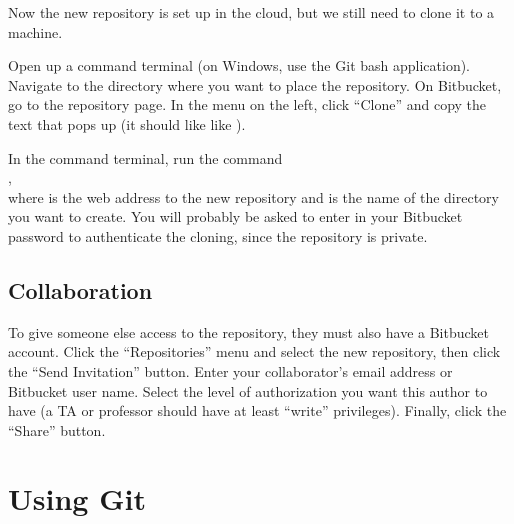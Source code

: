 Now the new repository is set up in the cloud, but we still need to clone it to a machine.

Open up a command terminal (on Windows, use the Git bash application).
Navigate to the directory where you want to place the repository.
On Bitbucket, go to the repository page.
In the menu on the left, click ``Clone'' and copy the text that pops up (it should like like ).

In the command terminal, run the command\\
,\\where {} is the web address to the new repository and  is the name of the directory you want to create.
You will probably be asked to enter in your Bitbucket password to authenticate the cloning, since the repository is private.
% 

\subsection*{Collaboration} %

To give someone else access to the repository, they must also have a Bitbucket account.
Click the ``Repositories'' menu and select the new repository, then click the ``Send Invitation'' button.
Enter your collaborator's email address or Bitbucket user name. %
Select the level of authorization you want this author to have (a TA or professor should have at least ``write'' privileges).
Finally, click the ``Share'' button.

\section*{Using Git} %

